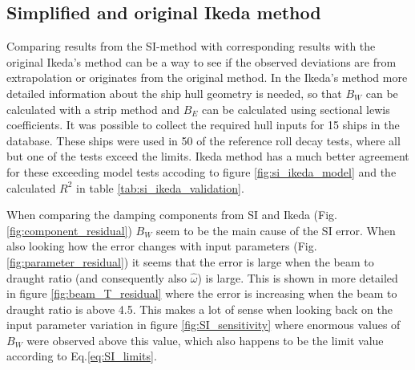 \subsection{Simplified and original Ikeda method}
\label{se:si_ikeda_model}
Comparing results from the SI-method with corresponding results with the original Ikeda's method can be a way to see if the observed deviations are from extrapolation or originates from the original method. In the Ikeda's method more detailed information about the ship hull geometry is needed, so that $B_W$ can be calculated with a strip method and $B_E$ can be calculated using sectional lewis coefficients. It was possible to collect the required hull inputs for 15 ships in the database. These ships were used in 50 of the reference roll decay tests, where all but one of the tests exceed the limits. Ikeda method has a much better agreement for these exceeding model tests accoding to figure \ref{fig:si_ikeda_model} and the calculated $R^2$ in table \ref{tab:si_ikeda_validation}.


When comparing the damping components from SI and Ikeda (Fig.\ref{fig:component_residual}) $B_W$ seem to be the main cause of the SI error. When also looking how the error changes with input parameters (Fig.\ref{fig:parameter_residual}) it seems that the error is large when the beam to draught ratio (and consequently also $\hat{\omega}$) is large. This is shown in more detailed in figure \ref{fig:beam_T_residual} where the error is increasing when the beam to draught ratio is above 4.5. This makes a lot of sense when looking back on the input parameter variation in figure \ref{fig:SI_sensitivity} where enormous values of $B_W$ were observed above this value, which also happens to be the limit value according to Eq.\ref{eq:SI_limits}.

